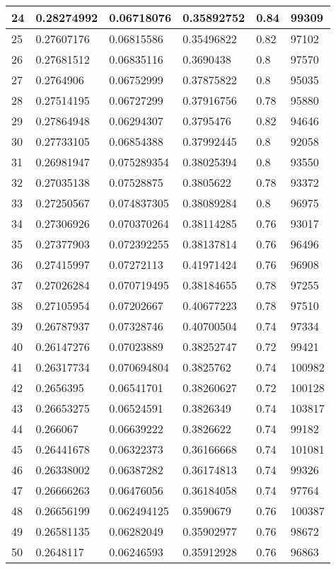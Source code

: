 \begin{longtable}{|l|l|l|l|l|l|}
24 & 0.28274992 & 0.06718076 & 0.35892752 & 0.84 & 99309 \\ \hline 
25 & 0.27607176 & 0.06815586 & 0.35496822 & 0.82 & 97102 \\ \hline 
26 & 0.27681512 & 0.06835116 & 0.3690438 & 0.8 & 97570 \\ \hline 
27 & 0.2764906 & 0.06752999 & 0.37875822 & 0.8 & 95035 \\ \hline 
28 & 0.27514195 & 0.06727299 & 0.37916756 & 0.78 & 95880 \\ \hline 
29 & 0.27864948 & 0.06294307 & 0.3795476 & 0.82 & 94646 \\ \hline 
30 & 0.27733105 & 0.06854388 & 0.37992445 & 0.8 & 92058 \\ \hline 
31 & 0.26981947 & 0.075289354 & 0.38025394 & 0.8 & 93550 \\ \hline 
32 & 0.27035138 & 0.07528875 & 0.3805622 & 0.78 & 93372 \\ \hline 
33 & 0.27250567 & 0.074837305 & 0.38089284 & 0.8 & 96975 \\ \hline 
34 & 0.27306926 & 0.070370264 & 0.38114285 & 0.76 & 93017 \\ \hline 
35 & 0.27377903 & 0.072392255 & 0.38137814 & 0.76 & 96496 \\ \hline 
36 & 0.27415997 & 0.07272113 & 0.41971424 & 0.76 & 96908 \\ \hline 
37 & 0.27026284 & 0.070719495 & 0.38184655 & 0.78 & 97255 \\ \hline 
38 & 0.27105954 & 0.07202667 & 0.40677223 & 0.78 & 97510 \\ \hline 
39 & 0.26787937 & 0.07328746 & 0.40700504 & 0.74 & 97334 \\ \hline 
40 & 0.26147276 & 0.07023889 & 0.38252747 & 0.72 & 99421 \\ \hline 
41 & 0.26317734 & 0.070694804 & 0.3825762 & 0.74 & 100982 \\ \hline 
42 & 0.2656395 & 0.06541701 & 0.38260627 & 0.72 & 100128 \\ \hline 
43 & 0.26653275 & 0.06524591 & 0.3826349 & 0.74 & 103817 \\ \hline 
44 & 0.266067 & 0.06639222 & 0.3826622 & 0.74 & 99182 \\ \hline 
45 & 0.26441678 & 0.06322373 & 0.36166668 & 0.74 & 101081 \\ \hline 
46 & 0.26338002 & 0.06387282 & 0.36174813 & 0.74 & 99326 \\ \hline 
47 & 0.26666263 & 0.06476056 & 0.36184058 & 0.74 & 97764 \\ \hline 
48 & 0.26656199 & 0.062494125 & 0.3590679 & 0.76 & 100387 \\ \hline 
49 & 0.26581135 & 0.06282049 & 0.35902977 & 0.76 & 98672 \\ \hline 
50 & 0.2648117 & 0.06246593 & 0.35912928 & 0.76 & 96863 \\ \hline 
\end{longtable}